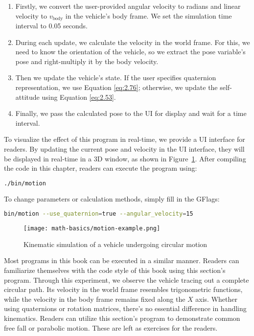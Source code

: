 \begin{enumerate}
	\item Firstly, we convert the user-provided angular velocity to radians and linear velocity to \( v_{\text{body}} \) in the vehicle's body frame. We set the simulation time interval to 0.05 seconds.
	\item During each update, we calculate the velocity in the world frame. For this, we need to know the orientation of the vehicle, so we extract the pose variable's pose and right-multiply it by the body velocity.
	\item Then we update the vehicle's state. If the user specifies quaternion representation, we use Equation \eqref{eq:2.76}; otherwise, we update the self-attitude using Equation \eqref{eq:2.53}.
	\item Finally, we pass the calculated pose to the UI for display and wait for a time interval.
\end{enumerate}

To visualize the effect of this program in real-time, we provide a UI interface for readers. By updating the current pose and velocity in the UI interface, they will be displayed in real-time in a 3D window, as shown in Figure~\ref{fig:motion-example}. After compiling the code in this chapter, readers can execute the program using:

\begin{lstlisting}[language=sh,caption=Terminal Input:]
./bin/motion
\end{lstlisting}

To change parameters or calculation methods, simply fill in the GFlags:

\begin{lstlisting}[language=sh,caption=Terminal Input:]
bin/motion --use_quaternion=true --angular_velocity=15
\end{lstlisting}

\begin{figure}[!htp]
	\centering
	\texttt{[image: math-basics/motion-example.png]}
	\caption{Kinematic simulation of a vehicle undergoing circular motion}
	\label{fig:motion-example}
\end{figure}

Most programs in this book can be executed in a similar manner. Readers can familiarize themselves with the code style of this book using this section's program. Through this experiment, we observe the vehicle tracing out a complete circular path. Its velocity in the world frame resembles trigonometric functions, while the velocity in the body frame remains fixed along the $X$ axis. Whether using quaternions or rotation matrices, there's no essential difference in handling kinematics. Readers can utilize this section's program to demonstrate common free fall or parabolic motion. These are left as exercises for the readers.

